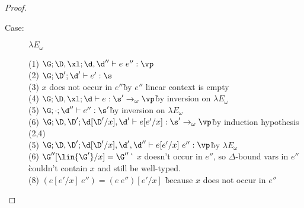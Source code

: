 \begin{proof}
\begin{description}
\item[Case:] $\lambda E_\omega$
\begin{tabbing}
  (1) $\G; \D, \xl; \d,\d'' \vdash e~e'' : \vp$\\
  (2) $\G; \D'; \d' \vdash e' : \s$\\
  (3) $x$ does not occur in $e''$\` by $e''$ linear context is empty\\
  (4) $\G; \D, \xl; \d \vdash e : \s' \to_\omega \vp$\` by inversion on $\lambda E_\omega$\\
  (5) $\G; \cdot; \d'' \vdash e'' : \s'$\` by inversion on $\lambda E_\omega$\\
  (6) $\G; \D, \D'; \d[\D'/x], \d' \vdash e[e'/x] : \s' \to_\omega \vp$\` by induction hypothesis (2,4)\\
  (5) $\G; \D, \D'; \d[\D'/x], \d', \d'' \vdash e[e'/x]~e'' : \vp$\` by $\lambda E_\omega$\\
  (6) $\G''[\lin{\G'}/x] = \G''$\` $x$ doesn't occur in $e''$, so $\Delta$-bound vars in $e''$ \\
      \` couldn't contain $x$ and still be well-typed.\\
  (8) $(e[e'/x]~e'') = (e~e'')[e'/x]$ \` because $x$ does not occur in $e''$\\
\end{tabbing}


\end{description}
\end{proof}

